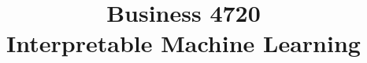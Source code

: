 \documentclass{article}
\title{Business 4720\\ \vspace{\baselineskip}
Interpretable Machine Learning}
\begin{document}
\maketitle

\vfill

\clearpage


\end{document}
